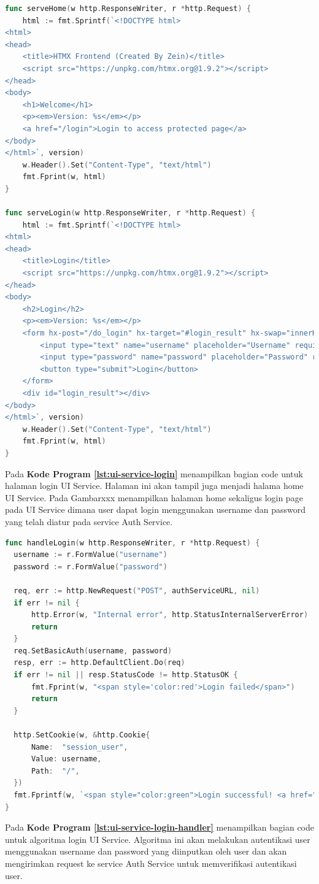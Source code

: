 \begin{lstlisting}[language=go, 
  basicstyle=\footnotesize\ttfamily,
  caption={Implementasi UI Service Halaman Login},
  label={lst:ui-service-login}]
func serveHome(w http.ResponseWriter, r *http.Request) {
    html := fmt.Sprintf(`<!DOCTYPE html>
<html>
<head>
    <title>HTMX Frontend (Created By Zein)</title>
    <script src="https://unpkg.com/htmx.org@1.9.2"></script>
</head>
<body>
    <h1>Welcome</h1>
    <p><em>Version: %s</em></p>
    <a href="/login">Login to access protected page</a>
</body>
</html>`, version)
    w.Header().Set("Content-Type", "text/html")
    fmt.Fprint(w, html)
}

func serveLogin(w http.ResponseWriter, r *http.Request) {
    html := fmt.Sprintf(`<!DOCTYPE html>
<html>
<head>
    <title>Login</title>
    <script src="https://unpkg.com/htmx.org@1.9.2"></script>
</head>
<body>
    <h2>Login</h2>
    <p><em>Version: %s</em></p>
    <form hx-post="/do_login" hx-target="#login_result" hx-swap="innerHTML">
        <input type="text" name="username" placeholder="Username" required><br>
        <input type="password" name="password" placeholder="Password" required><br>
        <button type="submit">Login</button>
    </form>
    <div id="login_result"></div>
</body>
</html>`, version)
    w.Header().Set("Content-Type", "text/html")
    fmt.Fprint(w, html)
}
\end{lstlisting}
Pada \textbf{Kode Program \ref{lst:ui-service-login}} menampilkan bagian code
untuk halaman login UI Service. Halaman ini akan tampil juga menjadi halama
home UI Service. Pada Gambarxxx menampilkan halaman home sekaligus login page
pada UI Service dimana user dapat login menggunakan username dan password yang
telah diatur pada service Auth Service.

\begin{lstlisting}[language=go, 
  basicstyle=\footnotesize\ttfamily,
  caption={Implementasi Algoritma Login UI Service},
  label={lst:ui-service-login-handler}]
func handleLogin(w http.ResponseWriter, r *http.Request) {
  username := r.FormValue("username")
  password := r.FormValue("password")

  req, err := http.NewRequest("POST", authServiceURL, nil)
  if err != nil {
      http.Error(w, "Internal error", http.StatusInternalServerError)
      return
  }
  req.SetBasicAuth(username, password)
  resp, err := http.DefaultClient.Do(req)
  if err != nil || resp.StatusCode != http.StatusOK {
      fmt.Fprint(w, "<span style='color:red'>Login failed</span>")
      return
  }

  http.SetCookie(w, &http.Cookie{
      Name:  "session_user",
      Value: username,
      Path:  "/",
  })
  fmt.Fprintf(w, `<span style="color:green">Login successful! <a href="/protected">Go to protected page</a></span><br><em>Version: %s</em>`, version)
}
\end{lstlisting}
Pada \textbf{Kode Program \ref{lst:ui-service-login-handler}} menampilkan
bagian code untuk algoritma login UI Service. Algoritma ini akan melakukan
autentikasi user menggunakan username dan password yang diinputkan oleh user
dan akan mengirimkan request ke service Auth Service untuk memverifikasi
autentikasi user.

